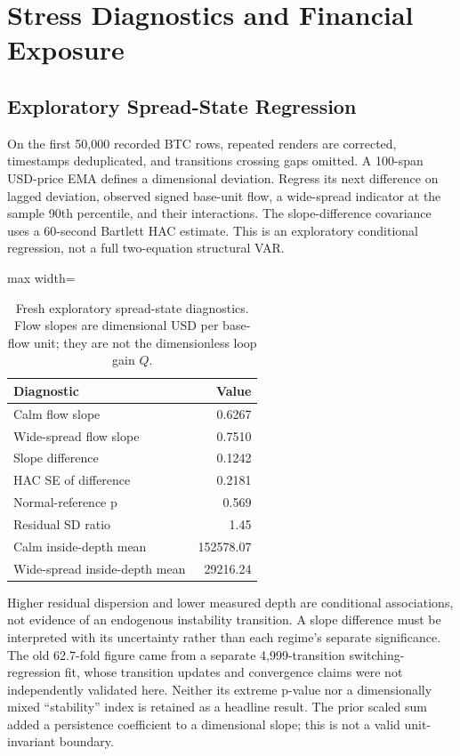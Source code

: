 \documentclass[12pt]{article}
\theoremstyle{definition}
\theoremstyle{remark}
\begin{document}
\section{Stress Diagnostics and Financial Exposure}
\label{sec:stress_fragility}
\subsection{Exploratory Spread-State Regression}
On the first 50,000 recorded BTC rows, repeated renders are corrected, timestamps deduplicated, and transitions crossing gaps omitted. A 100-span USD-price EMA defines a dimensional deviation. Regress its next difference on lagged deviation, observed signed base-unit flow, a wide-spread indicator at the sample 90th percentile, and their interactions. The slope-difference covariance uses a 60-second Bartlett HAC estimate. This is an exploratory conditional regression, not a full two-equation structural VAR.

\begin{table}[htbp]
\centering\small
\caption{Fresh exploratory spread-state diagnostics. Flow slopes are dimensional USD per base-flow unit; they are not the dimensionless loop gain $Q$.}
\label{tab:stress_revised}
\begin{adjustbox}{max width=\textwidth}
\begin{tabular}{lr}\toprule
Diagnostic & Value \\\midrule
Calm flow slope & 0.6267 \\
Wide-spread flow slope & 0.7510 \\
Slope difference & 0.1242 \\
HAC SE of difference & 0.2181 \\
Normal-reference p & 0.569 \\
Residual SD ratio & 1.45 \\
Calm inside-depth mean & 152578.07 \\
Wide-spread inside-depth mean & 29216.24 \\
\bottomrule\end{tabular}
\end{adjustbox}
\end{table}

Higher residual dispersion and lower measured depth are conditional associations, not evidence of an endogenous instability transition. A slope difference must be interpreted with its uncertainty rather than each regime's separate significance. The old 62.7-fold figure came from a separate 4,999-transition switching-regression fit, whose transition updates and convergence claims were not independently validated here. Neither its extreme p-value nor a dimensionally mixed ``stability'' index is retained as a headline result. The prior scaled sum added a persistence coefficient to a dimensional slope; this is not a valid unit-invariant boundary.
\end{document}
